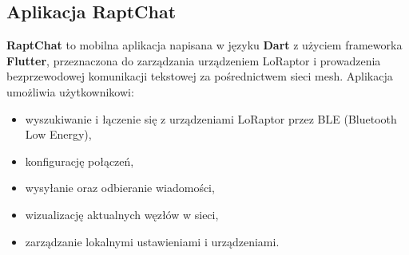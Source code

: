 \subsection{Aplikacja RaptChat}

\textbf{RaptChat} to mobilna aplikacja napisana w języku \textbf{Dart} z użyciem frameworka \textbf{Flutter}, przeznaczona do zarządzania urządzeniem LoRaptor i prowadzenia bezprzewodowej komunikacji tekstowej za pośrednictwem sieci mesh. Aplikacja umożliwia użytkownikowi:

\begin{itemize}
	\item wyszukiwanie i łączenie się z urządzeniami LoRaptor przez BLE (Bluetooth Low Energy),
	\item konfigurację połączeń,
	\item wysyłanie oraz odbieranie wiadomości,
	\item wizualizację aktualnych węzłów w sieci,
	\item zarządzanie lokalnymi ustawieniami i urządzeniami.
\end{itemize}

